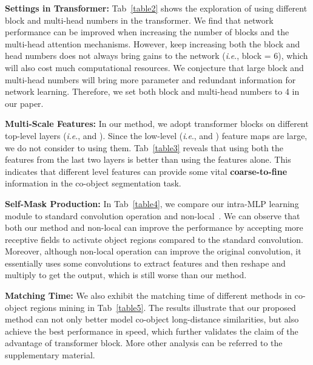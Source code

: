 \documentclass[journal]{IEEEtran}
\newcommand{\ie}{\textit{i}.\textit{e}., }
\begin{document}
\vspace{1ex}

\noindent \textbf{Settings in Transformer:}
Tab~\ref{table2} shows the exploration of using different block and multi-head numbers in the transformer. We find that network performance can be improved when increasing the number of blocks and the multi-head attention mechanisms. However, keep increasing both the block and head numbers does not always bring gains to the network (\ie block = 6), which will also cost much computational resources.
We conjecture that large block and multi-head numbers will bring more parameter and redundant information for network learning. Therefore, we set both block and multi-head numbers to 4 in our paper.

\vspace{1ex}

\noindent \textbf{Multi-Scale Features:}
In our method, we adopt transformer blocks on different top-level layers (\ie  and ). Since the low-level (\ie  and ) feature maps are large, we do not consider to using them. Tab~\ref{table3} reveals that using both the features from the last two layers is better than using the features alone. This indicates that different level features can provide some vital \textbf{coarse-to-fine} information in the co-object segmentation task.

\vspace{1ex}

\noindent \textbf{Self-Mask Production:}
In Tab~\ref{table4}, we compare our intra-MLP learning module to standard convolution operation and non-local~\cite{wang2018non}. We can observe that both our method and non-local can improve the performance by accepting more receptive fields to activate object regions compared to the standard convolution. Moreover, although non-local operation can improve the original convolution, it essentially uses some  convolutions to extract features and then reshape and multiply to get the output, which is still worse than our method.

\vspace{1ex}

\noindent \textbf{Matching Time:}
We also exhibit the matching time of different methods in co-object regions mining in Tab~\ref{table5}. The results illustrate that our proposed method can not only better model co-object long-distance similarities, but also achieve the best performance in speed, which further validates the claim of the advantage of transformer block. More other analysis can be referred to the supplementary material.
\end{document}
